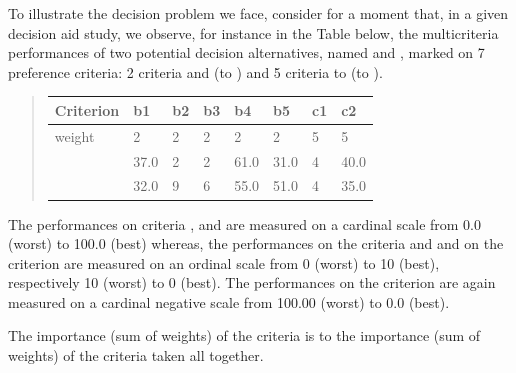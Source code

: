 \documentclass[a4paper,12pt,english]{sphinxhowto}
\begin{document}
To illustrate the decision problem we face, consider for a moment that, in a given decision aid study, we observe, for instance in the Table below, the multi\sphinxhyphen{}criteria performances of two potential decision alternatives, named  and , marked on 7  preference criteria: 2  criteria  and  (to ) and 5  criteria  to  (to ).
\begin{quote}


\begin{savenotes}\sphinxattablestart
\centering
\begin{tabulary}{\linewidth}[t]{|T|T|T|T|T|T|T|T|}
\hline
\sphinxstyletheadfamily 
Criterion
&\sphinxstyletheadfamily 
b1
&\sphinxstyletheadfamily 
b2
&\sphinxstyletheadfamily 
b3
&\sphinxstyletheadfamily 
b4
&\sphinxstyletheadfamily 
b5
&\sphinxstyletheadfamily 
c1
&\sphinxstyletheadfamily 
c2
\\
\hline
weight
&
2
&
2
&
2
&
2
&
2
&
5
&
5
\\
\hline
{}
&
37.0
&
2
&
2
&
61.0
&
31.0
&
\sphinxhyphen{}4
&
\sphinxhyphen{}40.0
\\
\hline
{}
&
32.0
&
9
&
6
&
55.0
&
51.0
&
\sphinxhyphen{}4
&
\sphinxhyphen{}35.0
\\
\hline
\end{tabulary}
\par
\sphinxattableend\end{savenotes}
\end{quote}

The performances on  criteria ,  and  are measured on a cardinal scale from 0.0 (worst) to 100.0 (best) whereas, the performances on the  criteria  and   and on the  criterion  are measured on an ordinal scale from 0 (worst) to 10 (best), respectively \sphinxhyphen{}10 (worst) to 0 (best). The performances on the  criterion  are again measured on a cardinal negative scale from \sphinxhyphen{}100.00 (worst) to 0.0 (best).

The importance (sum of weights) of the  criteria is  to the importance (sum of weights) of the  criteria taken all together.
\end{document}
